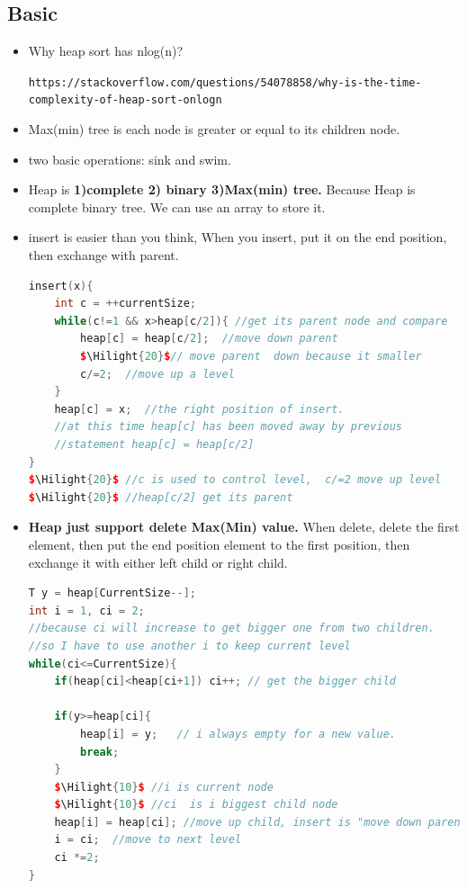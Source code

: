 \documentclass[a4paper,11pt,twoside]{book}
\newcommand{\Hilight}[1]{\makebox[0pt][l]{\color{yellow}\rule[-3pt]{#1em}{11pt}}}
\begin{document}
\subsection{Basic}
\begin{itemize}
	
\item Why heap sort has nlog(n)?

\verb|https://stackoverflow.com/questions/54078858/why-is-the-time-complexity-of-heap-sort-onlogn|
	
\item Max(min) tree is each node is greater or equal to its children node.

\item two basic operations: sink and swim.

\item Heap is \textbf{1)complete 2) binary 3)Max(min) tree.} Because Heap is complete binary tree. We can use an array to store it. 

\item insert is easier than you think, When you insert, put it on the end position, then exchange with parent.  
\begin{lstlisting}[frame=single, language=c++, mathescape=true]
insert(x){
	int c = ++currentSize;
	while(c!=1 && x>heap[c/2]){ //get its parent node and compare
		heap[c] = heap[c/2];  //move down parent
		$\Hilight{20}$// move parent  down because it smaller
		c/=2;  //move up a level 
	}  
	heap[c] = x;  //the right position of insert. 
	//at this time heap[c] has been moved away by previous 
	//statement heap[c] = heap[c/2] 
}
$\Hilight{20}$ //c is used to control level,  c/=2 move up level
$\Hilight{20}$ //heap[c/2] get its parent	
\end{lstlisting}

\item \textbf{Heap just support delete Max(Min) value.} When delete, delete the first element, then put the end position element to the first position, then exchange it with either left child or right child. 
\begin{lstlisting}[frame=single, language=c++, mathescape=true]
T y = heap[CurrentSize--];
int i = 1, ci = 2;
//because ci will increase to get bigger one from two children.
//so I have to use another i to keep current level
while(ci<=CurrentSize){
	if(heap[ci]<heap[ci+1]) ci++; // get the bigger child
	
	if(y>=heap[ci]{
		heap[i] = y;   // i always empty for a new value. 
		break; 
	}
	$\Hilight{10}$ //i is current node
	$\Hilight{10}$ //ci  is i biggest child node
	heap[i] = heap[ci]; //move up child, insert is "move down parent"
	i = ci;  //move to next level
	ci *=2;
}	
\end{lstlisting}




\end{itemize}
\end{document}
